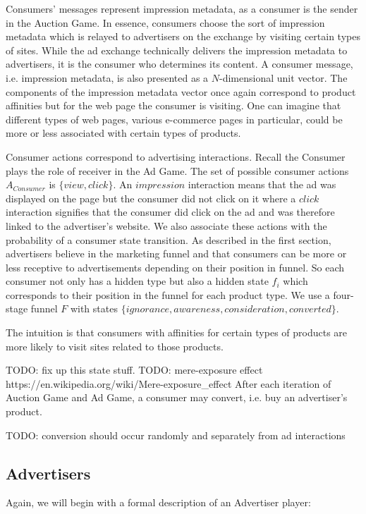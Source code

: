\documentclass{article}
\begin{document}
Consumers' messages represent impression metadata, as a consumer is the sender in the Auction Game. In essence, consumers choose the sort of impression metadata which is relayed to advertisers on the exchange by visiting certain types of sites. While the ad exchange technically delivers the impression metadata to advertisers, it is the consumer who determines its content. A consumer message, i.e. impression metadata, is also presented as a $N$-dimensional unit vector. The components of the impression metadata vector once again correspond to product affinities but for the web page the consumer is visiting. One can imagine that different types of web pages, various e-commerce pages in particular, could be more or less associated with certain types of products. 

Consumer actions correspond to advertising interactions. Recall the Consumer plays the role of receiver in the Ad Game. The set of possible consumer actions $A_{Consumer}$ is $\{view, click\}$. An $impression$ interaction means that the ad was displayed on the page but the consumer did not click on it where a $click$ interaction signifies that the consumer did click on the ad and was therefore linked to the advertiser's website. We also associate these actions with the probability of a consumer state transition. As described in the first section, advertisers believe in the marketing funnel and that consumers can be more or less receptive to advertisements depending on their position in funnel. So each consumer not only has a hidden type but also a hidden state $f_i$ which corresponds to their position in the funnel for each product type. We use a four-stage funnel $F$ with states $\{ignorance, awareness, consideration, converted\}$. 

The intuition is that consumers with affinities for certain types of products are more likely to visit sites related to those products.

TODO: fix up this state stuff.
TODO: mere-exposure effect https://en.wikipedia.org/wiki/Mere-exposure\_effect
After each iteration of Auction Game and Ad Game, a consumer may convert, i.e. buy an advertiser's product.

TODO: conversion should occur randomly and separately from ad interactions

\subsection{Advertisers}

Again, we will begin with a formal description of an Advertiser player:
\end{document}

